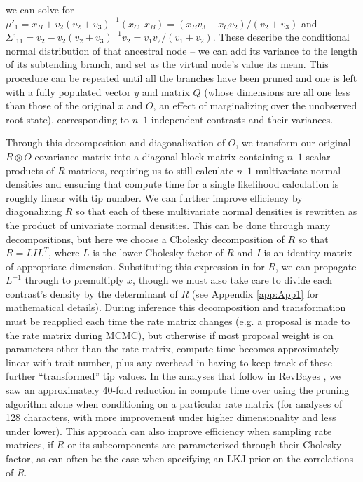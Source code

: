 we can solve for $\mu'_1 = x_B + v_2(v_2 + v_3)^{-1}(x_C – x_B) = (x_Bv_3 + x_Cv_2) / (v_2 + v_3)$ and $\Sigma’_{11} = v_2 - v_2(v_2 + v_3)^{-1}v_2 = v_1v_2/(v_1 + v_2)$. These describe the conditional normal distribution of that ancestral node – we can add its variance to the length of its subtending branch, and set as the virtual node’s value its mean. This procedure can be repeated until all the branches have been pruned and one is left with a fully populated vector $y$ and matrix $Q$ (whose dimensions are all one less than those of the original $x$ and $O$, an effect of marginalizing over the unobserved root state), corresponding to $n – 1$ independent contrasts and their variances.

Through this decomposition and diagonalization of $O$, we transform our original $R \otimes O$ covariance matrix into a diagonal block matrix containing $n – 1$ scalar products of $R$ matrices, requiring us to still calculate $n – 1$ multivariate normal densities and ensuring that compute time for a single likelihood calculation is roughly linear with tip number. We can further improve efficiency by diagonalizing $R$ so that each of these multivariate normal densities is rewritten as the product of univariate normal densities. This can be done through many decompositions, but here we choose a Cholesky decomposition of $R$ so that $R = LIL^T$, where $L$ is the lower Cholesky factor of $R$ and $I$ is an identity matrix of appropriate dimension. Substituting this expression in for $R$, we can propagate $L^{-1}$ through to premultiply $x$, though we must also take care to divide each contrast’s density by the determinant of $R$ (see Appendix \ref{app:App1} for mathematical details). During inference this decomposition and transformation must be reapplied each time the rate matrix changes (e.g. a proposal is made to the rate matrix during MCMC), but otherwise if most proposal weight is on parameters other than the rate matrix, compute time becomes approximately linear with trait number, plus any overhead in having to keep track of these further “transformed” tip values. In the analyses that follow in RevBayes \citep{hohnaRevBayesBayesianPhylogenetic2016a}, we saw an approximately 40-fold reduction in compute time over using the pruning algorithm alone when conditioning on a particular rate matrix (for analyses of 128 characters, with more improvement under higher dimensionality and less under lower). This approach can also improve efficiency when sampling rate matrices, if $R$ or its subcomponents are parameterized through their Cholesky factor, as can often be the case when specifying an LKJ prior on the correlations of $R$.

